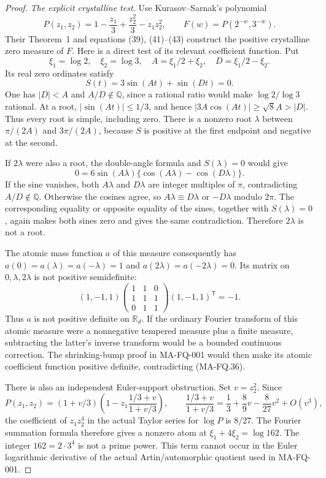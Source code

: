 \begin{proof}
\emph{The explicit crystalline test.}
Use Kurasov--Sarnak's polynomial
\[
 P(z_1,z_2)=1-\frac{z_1}{3}+\frac{z_2^2}{3}-z_1z_2^2,
 \qquad F(w)=P(2^{-w},3^{-w}).
 \tag{MA-FQ.33}
\]
Their Theorem~1 and equations (39), (41)--(43) construct
the positive crystalline zero measure of $F$.  Here is
a direct test of its relevant coefficient function.
Put
\[
 \xi_1=\log2,\quad \xi_2=\log3,\quad
 A=\xi_1/2+\xi_2,\quad D=\xi_1/2-\xi_2.
\]
Its real zero ordinates satisfy
\[
                 S(t)=3\sin(At)+\sin(Dt)=0.
 \tag{MA-FQ.34}
\]
One has $|D|<A$ and $A/D\notin\mathbb Q$, since a
rational ratio would make $\log2/\log3$ rational.
At a root, $|\sin(At)|\le1/3$, and hence
$|3A\cos(At)|\ge\sqrt8 A>|D|$.  Thus every root is
simple, including zero.  There is a nonzero root
$\lambda$ between $\pi/(2A)$ and $3\pi/(2A)$, because
$S$ is positive at the first endpoint and negative at
the second.

If $2\lambda$ were also a root, the double-angle formula
and $S(\lambda)=0$ would give
\[
           0=6\sin(A\lambda)
                     \{\cos(A\lambda)-\cos(D\lambda)\}.
 \tag{MA-FQ.35}
\]
If the sine vanishes, both $A\lambda$ and $D\lambda$
are integer multiples of $\pi$, contradicting
$A/D\notin\mathbb Q$.  Otherwise the cosines agree,
so $A\lambda\equiv D\lambda$ or $-D\lambda$ modulo
$2\pi$.  The corresponding equality or opposite
equality of the sines, together with $S(\lambda)=0$,
again makes both sines zero and gives the same
contradiction.  Therefore $2\lambda$ is not a root.

The atomic mass function $a$ of this measure consequently
has $a(0)=a(\lambda)=a(-\lambda)=1$ and
$a(2\lambda)=a(-2\lambda)=0$.  Its matrix on
$0,\lambda,2\lambda$ is not positive semidefinite:
\[
 (1,-1,1)
 \begin{pmatrix}1&1&0\\1&1&1\\0&1&1\end{pmatrix}
 (1,-1,1)^{\mathsf T}=-1.
 \tag{MA-FQ.36}
\]
Thus $a$ is not positive definite on $\mathbb R_d$.
If the ordinary Fourier transform of this atomic
measure were a nonnegative tempered measure plus a
finite measure, subtracting the latter's inverse
transform would be a bounded continuous correction.
The shrinking-bump proof in MA-FQ-001 would then make
its atomic coefficient function positive definite,
contradicting (MA-FQ.36).

There is also an independent Euler-support obstruction.
Set $v=z_2^2$.  Since
\[
 P(z_1,z_2)=(1+v/3)
       \left(1-z_1\frac{1/3+v}{1+v/3}\right),\qquad
 \frac{1/3+v}{1+v/3}
     =\frac13+\frac89v-\frac8{27}v^2+O(v^3),
\]
the coefficient of $z_1z_2^4$ in the actual Taylor
series for $\log P$ is $8/27$.
The Fourier summation formula therefore gives a
nonzero atom at $\xi_1+4\xi_2=\log162$.
The integer $162=2\cdot3^4$ is not a prime power.
This term cannot occur in the Euler logarithmic
derivative of the actual Artin/automorphic quotient
used in MA-FQ-001.


\end{proof}
